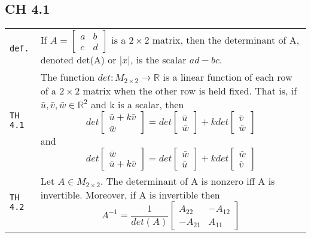 \documentclass[10pt,landscape]{article}
\begin{document}
\begin{multicols}{3}
\section{CH 4.1}
\begin{tabular}{@{}p{\the\MyLen}%
                @{}p{\linewidth-\the\MyLen}@{}} %
\verb!def.! & If $A = \begin{bmatrix} a & b \\ c & d\end{bmatrix}$ is a $2\!\times\! 2$ matrix, then the determinant of A, denoted det(A) or $\left| x \right|$, is the scalar $ad-bc$.\\
\verb!TH 4.1! & The function $det: M_{2\!\times\! 2}\rightarrow \mathbb{R}$ is a linear function of each row of a $2\!\times\! 2$ matrix when the other row is held fixed. That is, if 
               $\bar{u},\bar{v},\bar{w}\in\mathbb{R}^2$ and k is a scalar, then
               \begin{equation*} 
               det\begin{bmatrix}\bar{u} + k\bar{v}\\ \bar{w}\end{bmatrix} = 
               det\begin{bmatrix}\bar{u} \\ \bar{w}\end{bmatrix} + k det\begin{bmatrix}\bar{v} \\ \bar{w}
               \end{bmatrix} 
               \end{equation*}
               and
               \begin{equation*}
               det\begin{bmatrix} \bar{w} \\ \bar{u} + k\bar{v}\end{bmatrix} =
               det\begin{bmatrix} \bar{w} \\ \bar{u}\end{bmatrix} + kdet\begin{bmatrix}\bar{w} \\ \bar{v}\end{bmatrix}
               \end{equation*}\\
\verb!TH 4.2! & Let $A\in M_{2\!\times\! 2}$. The determinant of A is nonzero iff A is invertible. Moreover, if A is invertible then
               \begin{equation*}
               A^{-1} = \frac{1}{det(A)}\begin{bmatrix}A_{22} & -A_{12} \\ -A_{21} & A_{11} \end{bmatrix}
               \end{equation*}\\
\end{tabular}

\end{multicols}
\end{document}
